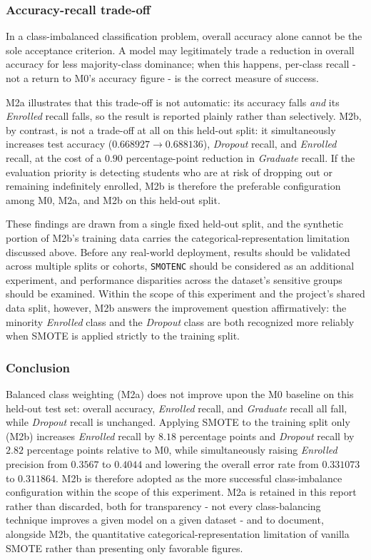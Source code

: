 \subsubsection{Accuracy-recall trade-off}
\label{sec:f2-tradeoff}

In a class-imbalanced classification problem, overall accuracy alone cannot be the
sole acceptance criterion. A model may legitimately trade a reduction in overall
accuracy for less majority-class dominance; when this happens,
per-class recall - not a return to M0's accuracy figure - is the correct measure
of success.

M2a illustrates that this trade-off is not automatic: its accuracy falls
\emph{and} its \textit{Enrolled} recall falls, so the result is reported plainly
rather than selectively. M2b, by contrast, is not a trade-off at all on this
held-out split: it simultaneously increases test accuracy ($0.668927 \rightarrow 0.688136$), \textit{Dropout}
recall, and \textit{Enrolled} recall, at the cost of a $0.90$ percentage-point
reduction in \textit{Graduate} recall. If the evaluation priority is detecting
students who are at risk of dropping out or remaining indefinitely enrolled, M2b
is therefore the preferable configuration among M0, M2a, and M2b on this held-out
split.

These findings are drawn from a single fixed held-out split, and the synthetic
portion of M2b's training data carries the categorical-representation limitation
discussed above. Before any real-world deployment, results should be validated
across multiple splits or cohorts, \texttt{SMOTENC} should be considered as an
additional experiment, and performance disparities across the dataset's
sensitive groups should be examined. Within the scope of this experiment and
the project's shared data split, however, M2b answers the improvement question
affirmatively: the
minority \textit{Enrolled} class and the \textit{Dropout} class are both
recognized more reliably when SMOTE is applied strictly to the training split.

\subsubsection{Conclusion}
\label{sec:f2-conclusion}

Balanced class weighting (M2a) does not improve upon the M0 baseline on this
held-out test set: overall accuracy, \textit{Enrolled} recall, and
\textit{Graduate} recall all fall, while \textit{Dropout} recall is unchanged.
Applying SMOTE to the training split only (M2b) increases \textit{Enrolled}
recall by $8.18$ percentage points and \textit{Dropout} recall by $2.82$
percentage points relative to M0, while simultaneously raising \textit{Enrolled}
precision from $0.3567$ to $0.4044$ and lowering the overall error rate from
$0.331073$ to $0.311864$. M2b is therefore adopted as the more successful
class-imbalance configuration within the scope of this experiment. M2a is
retained in this report rather than discarded, both for transparency - not every
class-balancing technique improves a given model on a given dataset - and to
document, alongside M2b, the quantitative categorical-representation limitation
of vanilla SMOTE rather than presenting only favorable figures.
